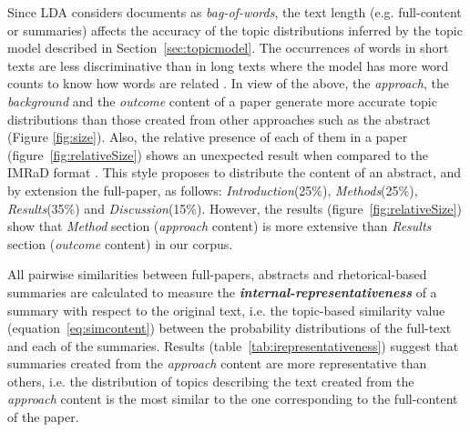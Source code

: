 Since LDA considers documents as \textit{bag-of-words}, the text length (e.g. full-content or summaries) affects the accuracy of the topic distributions inferred by the topic model described in Section~\ref{sec:topicmodel}. The occurrences of words in short texts are less discriminative than in long texts where the model has more word counts to know how words are related \citep{Hong2010}. In view of the above, the \textit{approach}, the \textit{background} and the \textit{outcome} content of a paper generate more accurate topic distributions than those created from other approaches such as the abstract (Figure \ref{fig:size}). Also, the relative presence of each of them in a paper (figure~\ref{fig:relativeSize}) shows an unexpected result when compared to the IMRaD format \citep{Nair2014}. This style proposes to distribute the content of an abstract, and by extension the full-paper, as follows: \textit{Introduction}(25\%), \textit{Methods}(25\%), \textit{Results}(35\%) and \textit{Discussion}(15\%). However, the results (figure~\ref{fig:relativeSize}) show that \textit{Method} section (\textit{approach} content) is more extensive than \textit{Results} section (\textit{outcome} content) in our corpus.

All pairwise similarities between full-papers, abstracts and rhetorical-based summaries are calculated to measure the \textbf{\textit{internal-representativeness}} of a summary with respect to the original text, i.e. the topic-based similarity value (equation~\ref{eq:simcontent}) between the probability distributions of the full-text and each of the summaries. Results (table~\ref{tab:irepresentativeness}) suggest that summaries created from the \textit{approach} content are more representative than others, i.e. the distribution of topics describing the text created from the \textit{approach} content is the most similar to the one corresponding to the full-content of the paper.

